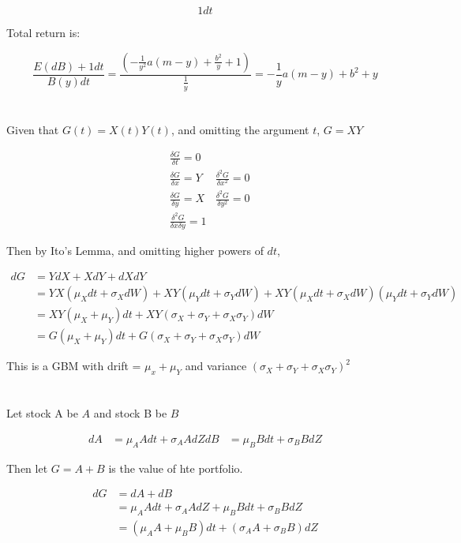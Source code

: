 \documentclass[11pt]{scrartcl}
\renewcommand{\dfrac}[2]{\ensuremath{\frac{\delta #1}{\delta #2}}}
\newcommand{\ddfrac}[2]{\ensuremath{\frac{\delta^2 #1}{\delta #2^2}}}
\newcommand{\dddfrac}[3]{\ensuremath{\frac{\delta^2 #1}{\delta #2 \delta #3}}}
\begin{document}
\[1dt\]

Total return is:

\[ \frac{E(dB) + 1dt}{B(y)dt} = \frac{\left(-\frac{1}{y^2}a(m-y) + \frac{b^2}{y} + 1\right)}{\frac{1}{y}} = -\frac{1}{y}a(m-y) + b^2 + y \]

\section{}

Given that $G(t) = X(t)Y(t)$, and omitting the argument $t$, $G=XY$

\begin{align*}
&\dfrac{G}{t} = 0 &\\
&\dfrac{G}{x} = Y &\ddfrac{G}{x} = 0 \\
&\dfrac{G}{y} = X &\ddfrac{G}{y} = 0 \\
&\dddfrac{G}{x}{y} = 1
\end{align*}

Then by Ito's Lemma, and omitting higher powers of $dt$, 

\begin{align*}
dG &= YdX + XdY + dXdY \\
&= YX(\mu_X dt + \sigma_XdW) + XY(\mu_Y dt + \sigma_YdW) + XY(\mu_Xdt +\sigma_XdW)(\mu_Ydt + \sigma_YdW) \\
&= XY(\mu_X + \mu_Y)dt + XY(\sigma_X + \sigma_Y + \sigma_X\sigma_Y)dW \\
&= G(\mu_X + \mu_Y)dt + G(\sigma_X + \sigma_Y + \sigma_X\sigma_Y)dW
\end{align*}

This is a GBM with drift = $\mu_x + \mu_Y$ and variance $(\sigma_X + \sigma_Y + \sigma_X\sigma_Y)^2$

\section{}

Let stock A be $A$ and stock B be $B$

\begin{align*}
dA &= \mu_A Adt + \sigma_A A dZ
dB &= \mu_B Bdt + \sigma_B B dZ
\end{align*}

Then let $G = A+B$ is the value of hte portfolio.

\begin{align*}
dG &= dA + dB \\
&= \mu_A Adt + \sigma_A A dZ + \mu_B Bdt + \sigma_B B dZ \\
&= (\mu_A A + \mu_B B) dt + (\sigma_A A + \sigma_B B) dZ
\end{align*}
\end{document}
